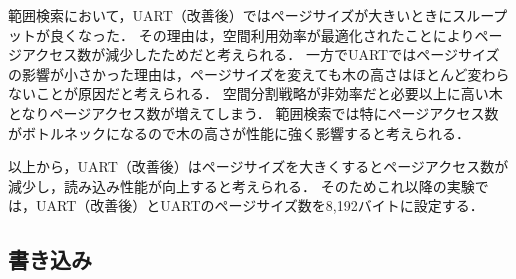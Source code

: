 範囲検索において，UART（改善後）ではページサイズが大きいときにスループットが良くなった．
その理由は，空間利用効率が最適化されたことによりページアクセス数が減少したためだと考えられる．
一方でUARTではページサイズの影響が小さかった理由は，ページサイズを変えても木の高さはほとんど変わらないことが原因だと考えられる．
空間分割戦略が非効率だと必要以上に高い木となりページアクセス数が増えてしまう．
範囲検索では特にページアクセス数がボトルネックになるので木の高さが性能に強く影響すると考えられる．

以上から，UART（改善後）はページサイズを大きくするとページアクセス数が減少し，読み込み性能が向上すると考えられる．
そのためこれ以降の実験では，UART（改善後）とUARTのページサイズ数を8,192バイトに設定する．

\subsection{書き込み}

